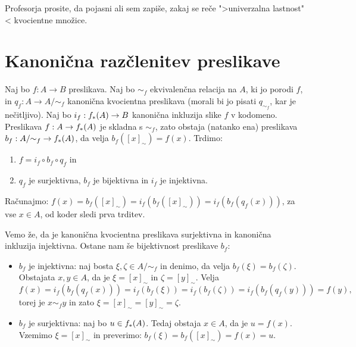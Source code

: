 \begin{opomba}
  Profesorja prosite, da pojasni ali sem zapiše, zakaj se reče ">univerzalna lastnost"< kvocientne množice.
\end{opomba}


\section{Kanonična razčlenitev preslikave}

Naj bo $f : A \to B$ preslikava. Naj bo $\sim_f$ ekvivalenčna relacija na $A$, ki jo porodi
$f$, in $q_f : A \to A/{\sim_f}$ kanonična kvocientna preslikava (morali bi jo pisati $q_{\sim_f}$,
kar je nečitljivo). Naj bo $i_f : f_{*}(A) \to B$ kanonična inkluzija slike $f$ v kodomeno.
Preslikava $f : A \to f_{*}(A)$ je skladna s $\sim_f$, zato obstaja (natanko ena) preslikava
$b_f : A/{\sim_f} \to f_{*}(A)$, da velja $b_f([x]_\sim) = f(x)$. Trdimo:
%
\begin{enumerate}
\item $f = i_f \circ b_f \circ q_f$ in
\item $q_f$ je surjektivna, $b_f$ je bijektivna in $i_f$ je injektivna.
\end{enumerate}
%
Računajmo: $f(x) = b_f([x]_\sim) = i_f(b_f([x]_\sim)) = i_f(b_f(q_f(x)))$, za vse $x \in A$, od
koder sledi prva trditev.

Vemo že, da je kanonična kvocientna preslikava surjektivna in kanonična inkluzija
injektivna. Ostane nam še bijektivnost preslikave $b_f$:
%
\begin{itemize}
\item $b_f$ je injektivna: naj bosta $\xi, \zeta \in A/{\sim_f}$ in denimo, da velja $b_f(\xi) = b_f(\zeta)$.
  Obstajata $x, y \in A$, da je $\xi = [x]_\sim$ in $\zeta = [y]_\sim$. Velja
  \begin{equation*}
    f(x) = i_f(b_f(q_f(x))) = i_f(b_f(\xi)) = i_f(b_f(\zeta)) = i_f(b_f(q_f(y))) = f(y),
  \end{equation*}
  torej je $x \sim_f y$ in zato $\xi = [x]_\sim = [y]_\sim = \zeta$.

  \item $b_f$ je surjektivna: naj bo $u \in f_{*}(A)$. Tedaj obstaja $x \in A$, da je $u = f(x)$.
  Vzemimo $\xi = [x]_\sim$ in preverimo: $b_f(\xi) = b_f([x]_\sim) =f(x) = u$.
\end{itemize}